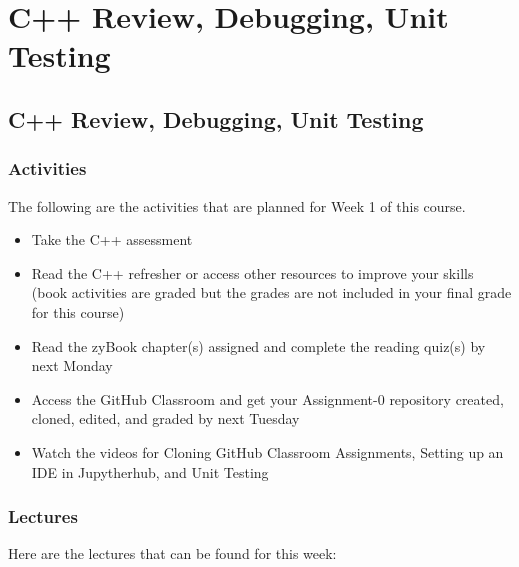 \clearpage

\newcommand{\ChapTitle}{C++ Review, Debugging, Unit Testing}

\chapter{\ChapTitle}
\section{\ChapTitle}

\subsection{Activities}

The following are the activities that are planned for Week 1 of this course.

\begin{itemize}
    \item Take the C++ assessment
    \item Read the C++ refresher or access other resources to improve your skills (book activities are graded but the grades are not included in your final grade for this course)
    \item Read the zyBook chapter(s) assigned and complete the reading quiz(s) by next Monday
    \item Access the GitHub Classroom and get your Assignment-0 repository created, cloned, edited, and graded by next Tuesday
    \item Watch the videos for Cloning GitHub Classroom Assignments, Setting up an IDE in Jupytherhub, and Unit Testing
\end{itemize}

\subsection{Lectures}

Here are the lectures that can be found for this week:

